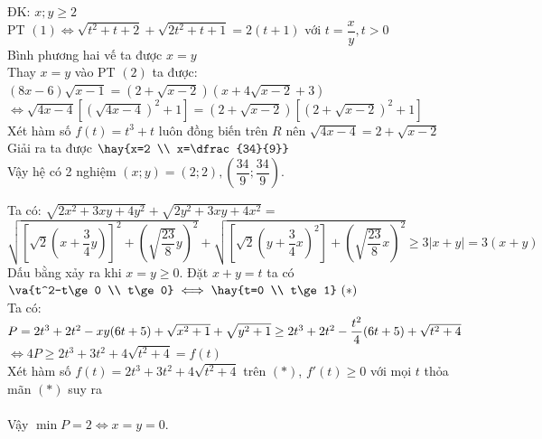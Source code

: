 \hda 
ĐK: $x;y\ge 2$\\
PT $(1)\iff \sqrt{t^2+t+2}+\sqrt{2t^2+t+1}=2(t+1)$ với $t=\dfrac{x}{y},t>0$\\
Bình phương hai vế ta được $x=y$\\
Thay $x=y$ vào PT $(2)$ ta được:\\
$(8x-6)\sqrt{x-1}=\left(2+\sqrt{x-2}\right)\left(x+4\sqrt{x-2}+3\right)$\\
$\iff \sqrt{4x-4}\left[\left(\sqrt{4x-4}\right)^2+1\right]=\left(2+\sqrt{x-2}\right)\left[\left(2+\sqrt{x-2}\right)^2+1\right]$\\
Xét hàm số $f(t)=t^3+t$ luôn đồng biến trên $R$ nên $\sqrt{4x-4}=2+\sqrt{x-2}$\\
Giải ra ta được $\hay{x=2 \\ x=\dfrac{34}{9}}$\\
Vậy hệ có 2 nghiệm $(x;y)=(2;2),\left(\dfrac{34}{9};\dfrac{34}{9}\right)$.

\hda 
Ta có: $\sqrt{2x^2+3xy+4y^2}+\sqrt{2y^2+3xy+4x^2}=$\\
$\sqrt{\left[\sqrt{2}\left(x+\dfrac{3}{4}y\right)\right]^2+\left(\sqrt{\dfrac{23}{8}}y\right)^2}+\sqrt{\left[\sqrt{2}\left(y+\dfrac{3}{4}x\right)^2\right]+\left(\sqrt{\dfrac{23}{8}}x\right)^2}\ge 3|x+y|=3(x+y)$\\
Dấu bằng xảy ra khi $x=y\ge 0$. Đặt $x+y=t$ ta có $\va{t^2-t\ge 0 \\ t\ge 0}\iff \hay{t=0 \\ t\ge 1}~(*)$\\
Ta có: $P=2t^3+2t^2-xy(6t+5)+\sqrt{x^2+1}+\sqrt{y^2+1}\\
\ge 2t^3+2t^2-\dfrac{t^2}{4}(6t+5)+\sqrt{t^2+4}$\\
$\iff 4P\ge 2t^3+3t^2+4\sqrt{t^2+4}=f(t)$\\
Xét hàm số $f(t)=2t^3+3t^2+4\sqrt{t^2+4}$ trên $(*)$, $f'(t)\ge 0$ với mọi $t$ thỏa mãn $(*)$ suy ra \\
\\
Vậy $\min P=2\iff x=y=0$.

